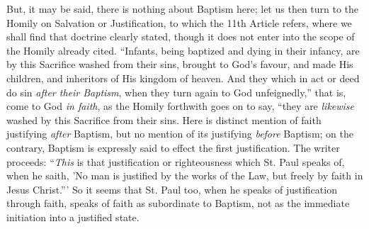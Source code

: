 But, it may be said, there is nothing about Baptism here; let us
then turn to the Homily on Salvation or Justification, to which the
11th Article refers, where we shall find that doctrine clearly stated,
though it does not enter into the scope of the Homily already cited.
``Infants, being baptized and dying in their infancy, are by this
Sacrifice washed from their sins, brought to God's favour, and made
His children, and inheritors of His kingdom of heaven. And they which
in act or deed do sin \emph{after their Baptism}, when they turn again
to God unfeignedly,'' that is, come to God \emph{in faith}, as the
Homily forthwith goes on to say, ``they are \emph{likewise} washed
by this Sacrifice from their sins. Here is distinct mention of faith
justifying \emph{after} Baptism, but no mention of its justifying \emph{before}
Baptism; on the contrary, Baptism is expressly said to effect the
first justification. The writer proceeds: ``\emph{This} is that
justification or righteousness which St. Paul speaks of, when he saith,
'No man is justified by the works of the Law, but freely by faith in
Jesus Christ.''' So it seems that St. Paul too, when he speaks of
justification through faith, speaks of faith as subordinate to
Baptism, not as the immediate initiation into a justified state.

